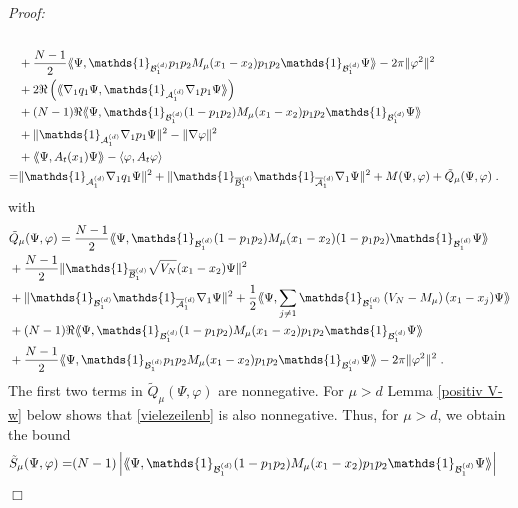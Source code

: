 \documentclass[11pt, english, american]{article}
\newcommand{\laa}{\langle\hspace{-0.08cm}\langle}
\newcommand{\raa}{\rangle\hspace{-0.08cm}\rangle}
\newenvironment{proof}{\emph{Proof:}}{\begin{flushright} $ \Box $ \end{flushright}}
\renewcommand{\phi}{\varphi}
\begin{document}
\begin{proof}
\begin{align*}
%
\\&+\frac{N-1}{2}\laa\Psi ,\mathds{1}_{\mathcal{B}^{(d)}_{1}}p_1p_2M_{\mu}(x_1-x_2)p_1p_2\mathds{1}_{\mathcal{B}^{(d)}_{1}}\Psi\raa -2\pi\|\phi^2\|^2
\\&+2 \Re\left(\laa\nabla_1q_1\Psi ,
\mathds{1}_{\mathcal{A}^{(d)}_{1}}
\nabla_1p_1\Psi \raa\right)
\\&
+(N-1)\Re\laa\Psi ,\mathds{1}_{\mathcal{B}^{(d)}_{1}}(1-p_1p_2)M_{\mu}(x_1-x_2)p_1p_2\mathds{1}_{\mathcal{B}^{(d)}_{1}}\Psi\raa
\\&
+ \|\mathds{1}_{\mathcal{A}^{(d)}_{1}}\nabla_1p_1\Psi \|^2-\|\nabla\phi \|^2
%
\\&+\laa\Psi, A_t(x_1)\Psi\raa-\langle\phi , A_t\phi\rangle
\\
=&
 \|\mathds{1}_{\mathcal{A}^{(d)}_{1}}\nabla_1q_1\Psi \|^2+
  \|\mathds{1}_{\overline{\mathcal{B}}^{(d)}_{1}}
\mathds{1}_{\overline{\mathcal{A}}^{(d)}_{1}}
\nabla_1\Psi \|^2
+
M( \Psi, \phi)+\tilde{Q}_\mu( \Psi, \phi)
\;.
\end{align*}
with
\begin{align}
&\tilde{Q}_\mu( \Psi, \phi)=
\frac{N-1}{2}\laa\Psi ,\mathds{1}_{\mathcal{B}^{(d)}_{1}}(1-p_1p_2)M_{\mu}(x_1-x_2)(1-p_1p_2)\mathds{1}_{\mathcal{B}^{(d)}_{1}}\Psi\raa
%
\nonumber
\\
&+
\frac{N-1}{2}\|\mathds{1}_{\overline{\mathcal{B}}^{(d)}_{1}}\sqrt{V_N}(x_1-x_2)\Psi \|^2
\nonumber
\\
\label{vielezeilenb}&
+ \|\mathds{1}_{\mathcal{B}^{(d)}_{1}}\mathds{1}_{\overline{\mathcal{A}}^{(d)}_{1}}\nabla_1\Psi \|^2
%
+
\frac{1}{2}
\laa\Psi ,\sum_{j\neq
1}\mathds{1}_{\mathcal{B}^{(d)}_{1}}\left(V_N-M_{\mu}\right)(x_1-x_j)\Psi \raa
%
\\&
\nonumber
+(N-1)\Re\laa\Psi ,\mathds{1}_{\mathcal{B}^{(d)}_{1}}(1-p_1p_2)M_{\mu}(x_1-x_2)p_1p_2\mathds{1}_{\mathcal{B}^{(d)}_{1}}\Psi\raa
\\
&+\frac{N-1}{2}\laa\Psi ,\mathds{1}_{\mathcal{B}^{(d)}_{1}}p_1p_2M_{\mu}(x_1-x_2)p_1p_2\mathds{1}_{\mathcal{B}^{(d)}_{1}}\Psi\raa -2\pi\|\phi^2\|^2
\;.
\nonumber
\end{align}
The first two terms in $\tilde{Q}_\mu( \Psi, \phi)$ are nonnegative.
For $\mu >d$ Lemma \ref{positiv V-w} below shows that \eqref{vielezeilenb} is also nonnegative. Thus, for $\mu >d$, we obtain the bound 
\begin{align}
\label{vielezeilenc2}
\tilde{S}_\mu( \Psi, \phi)=
&(N-1)\left|
\laa\Psi ,\mathds{1}_{\mathcal{B}^{(d)}_{1}}(1-p_1p_2)M_{\mu}(x_1-x_2)p_1p_2\mathds{1}_{\mathcal{B}^{(d)}_{1}}\Psi\raa
\right|

\end{align}
\end{proof}
\end{document}
